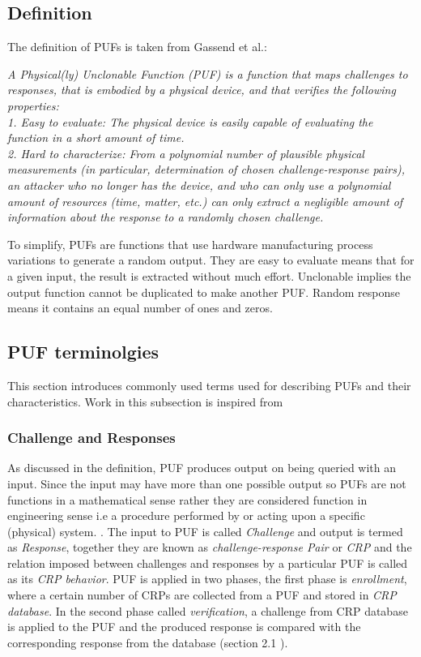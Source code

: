 \subsection{Definition}
The definition of PUFs is taken from Gassend et al.\cite{21}:

\emph{A Physical(ly) Unclonable Function (PUF) is a function that maps challenges to responses, that is embodied by a physical device, and that verifies the following properties:\\
1. Easy to evaluate: The physical device is easily capable of evaluating the function in a short amount of time.\\
2. Hard to characterize: From a polynomial number of plausible physical measurements (in particular, determination of chosen challenge-response pairs), an attacker who no longer has the device, and who can only use a polynomial amount of resources (time, matter, etc.) can only extract a negligible amount of information about the response to a randomly chosen challenge.\\}

To simplify, PUFs are functions that use hardware manufacturing process variations to generate a random output. They are easy to evaluate means that for a given input, the result is extracted without much effort. Unclonable implies the output function cannot be duplicated to make another PUF. Random response means it contains an equal number of ones and zeros.

\subsection{PUF terminolgies}
This section introduces commonly used terms used for describing PUFs and their characteristics. Work in this subsection is inspired from \cite{thbook}

\subsubsection{Challenge and Responses}
As discussed in the definition, PUF produces output on being queried with an input. Since the input may have more than one possible output so PUFs are not functions in a mathematical sense rather they are considered function in engineering sense i.e a procedure performed by or acting upon a specific (physical) system. \cite{thbook}. The input to PUF is called \emph{Challenge} and output is termed as \emph{Response}, together they are known as \emph{challenge-response Pair} or \emph{CRP} and
the relation imposed between challenges and responses by a particular PUF is called as its \emph{CRP behavior}. PUF is applied in two phases, the first phase is \emph{enrollment}, where a certain number of CRPs are collected from a PUF and stored in \emph{CRP database}. In the second phase called \emph{verification}, a challenge from CRP database is applied to the PUF and the produced response is compared with the corresponding response from the database (section 2.1 \cite{thbook}).

